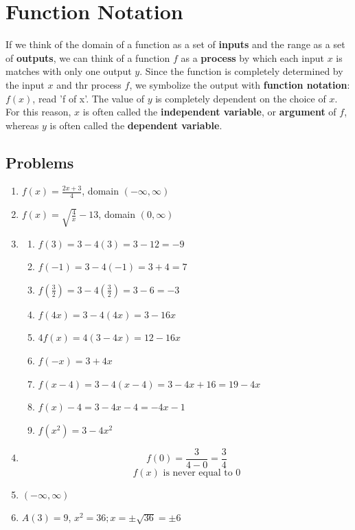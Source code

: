 \section{Function Notation}

\begin{definition}
    If we think of the domain of a function as a set of \textbf{inputs} and the range as a set of \textbf{outputs}, we can think of a function $f$ as a \textbf{process} by which each input $x$ is matches with only one output $y$. Since the function is completely determined by the input $x$ and thr process $f$, we symbolize the output with \textbf{function notation}: $f(x)$, read 'f of x'.
    The value of $y$ is completely dependent on the choice of $x$. For this reason, $x$ is often called the \textbf{independent variable}, or \textbf{argument} of $f$, whereas $y$ is often called the \textbf{dependent variable}.
\end{definition}

\subsection{Problems}
\begin{enumerate}
    \item [1.] $f(x)=\frac{2x + 3}{4}$, domain $(-\infty, \infty)$
    \item [10.] $f(x) = \sqrt{\frac{4}{x}} - 13$, domain $(0, \infty)$
    \item [12.]
          \begin{enumerate}[label=(\alph*)]
              \item $f(3) = 3-4(3)=3-12=-9$
              \item $f(-1) = 3 - 4(-1)=3+4=7$
              \item $f(\frac{3}{2}) = 3 - 4(\frac{3}{2})= 3-6 = -3$
              \item $f(4x) = 3-4(4x)=3-16x$
              \item $4f(x)=4(3-4x)=12-16x$
              \item $f(-x) = 3+4x$
              \item $f(x-4)=3-4(x-4)=3-4x+16=19-4x$
              \item $f(x)-4=3-4x-4=-4x-1$
              \item $f(x^2)=3-4x^2$
          \end{enumerate}
    \item [33.]
          \[
              f(0)=\frac{3}{4-0}=\frac{3}{4}
          \]
          \[
              f(x)\text{ is never equal to 0}
          \]
    \item [37.] $(-\infty, \infty)$
    \item [63.] $A(3)=9$, $x^2=36; x = \pm \sqrt{36} = \pm 6$
\end{enumerate}
